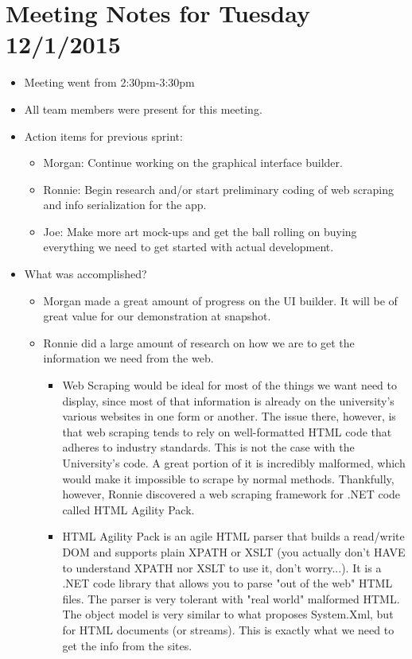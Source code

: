 \documentclass[]{article}
\begin{document}
\section{Meeting Notes for Tuesday 12/1/2015}
\begin{itemize}
	\item Meeting went from 2:30pm-3:30pm
	\item All team members were present for this meeting.
	\item Action items for previous sprint:
		\begin{itemize}
			\item Morgan: Continue working on the graphical interface builder.
			\item Ronnie: Begin research and/or start preliminary coding of web scraping and info serialization for the app. 
			\item Joe: Make more art mock-ups and get the ball rolling on buying everything we need to get started with actual development.
		\end{itemize}
	\item What was accomplished?
	\begin{itemize}
		\item Morgan made a great amount of progress on the UI builder. It will be of great value for our demonstration at snapshot.
		\item Ronnie did a large amount of research on how we are to get the information we need from the web. 
			\begin{itemize}
				\item Web Scraping would be ideal for most of the things we want need to display, since most of that information is already on the university's various websites in one form or another. The issue there, however, is that web scraping tends to rely on well-formatted HTML code that adheres to industry standards. This is not the case with the University's code. A great portion of it is incredibly malformed, which would make it impossible to scrape by normal methods. Thankfully, however, Ronnie discovered a web scraping framework for .NET code called HTML Agility Pack.
				\item HTML Agility Pack is an agile HTML parser that builds a read/write DOM and supports plain XPATH or XSLT (you actually don't HAVE to understand XPATH nor XSLT to use it, don't worry...). It is a .NET code library that allows you to parse "out of the web" HTML files. The parser is very tolerant with "real world" malformed HTML. The object model is very similar to what proposes System.Xml, but for HTML documents (or streams). This is exactly what we need to get the info from the sites.

\end{itemize}
\end{itemize}
\end{itemize}
\end{document}
